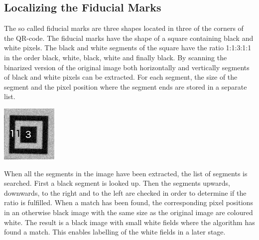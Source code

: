 \documentclass[12pt,a4paper]{article}
\newenvironment{Figure}
  {\par\medskip\noindent\minipage{\linewidth}}
  {\endminipage\par\medskip}
\begin{document}
\subsection{Localizing the Fiducial Marks}
The so called fiducial marks are three shapes located in three of the corners of the QR-code. The fiducial marks have the shape of a square containing black and white pixels. The black and white segments of the square have the ratio 1:1:3:1:1 \cite{belussi} in the order black, white, black, white and finally black. By scanning the binarized version of the original image both horizontally and vertically segments of black and white pixels can be extracted. For each segment, the size of the segment and the pixel position where the segment ends are stored in a separate list. 
\begin{Figure}
  \centering
    \includegraphics[width=0.7\linewidth]{./img/Fiducial.png}
\end{Figure}

When all the segments in the image have been extracted, the list of segments is searched. First a black segment is looked up. Then the segments upwards, downwards, to the right and to the left are checked in order to determine if the ratio is fulfilled. When a match has been found, the corresponding pixel positions in an otherwise black image with the same size as the original image are coloured white. The result is a black image with small white fields where the algorithm has found a match. This enables labelling of the white fields in a later stage. 
\end{document}
